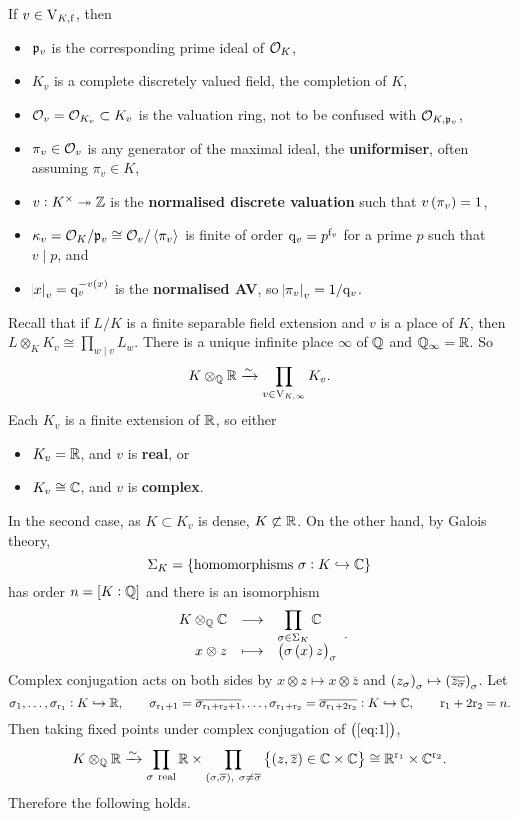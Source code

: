 \begin{notation*}
If $ v \in \mathrm{V}_{K, \mathrm{f}} $, then
\begin{itemize}
\item $ \mathfrak{p}_v $ is the corresponding prime ideal of $ \mathcal{O}_K $,
\item $ K_v $ is a complete discretely valued field, the completion of $ K $,
\item $ \mathcal{O}_v = \mathcal{O}_{K_v} \subset K_v $ is the valuation ring, not to be confused with $ \mathcal{O}_{K, \mathfrak{p}_v} $,
\item $ \pi_v \in \mathcal{O}_v $ is any generator of the maximal ideal, the \textbf{uniformiser}, often assuming $ \pi_v \in K $,
\item $ v : K^\times \twoheadrightarrow \mathbb{Z} $ is the \textbf{normalised discrete valuation} such that $ v\br{\pi_v} = 1 $,
\item $ \kappa_v = \mathcal{O}_K / \mathfrak{p}_v \cong \mathcal{O}_v / \left\langle \pi_v \right\rangle $ is finite of order $ \mathrm{q}_v = p^{\mathrm{f}_v} $ for a prime $ p $ such that $ v \mid p $, and
\item $ \abs{x}_v = \q_v^{-v\br{x}} $ is the \textbf{normalised AV}, so $ \abs{\pi_v}_v = 1 / \mathrm{q}_v $.
\end{itemize}
\end{notation*}

Recall that if $ L / K $ is a finite separable field extension and $ v $ is a place of $ K $, then $ L \otimes_K K_v \cong \prod_{w \mid v} L_w $. There is a unique infinite place $ \infty $ of $ \mathbb{Q} $ and $ \mathbb{Q}_\infty = \mathbb{R} $. So
$$ K \otimes_{\mathbb{Q}} \mathbb{R} \xrightarrow{\sim} \prod_{v \in \mathrm{V}_{K, \infty}} K_v. $$
Each $ K_v $ is a finite extension of $ \mathbb{R} $, so either
\begin{itemize}
\item $ K_v = \mathbb{R} $, and $ v $ is \textbf{real}, or
\item $ K_v \cong \mathbb{C} $, and $ v $ is \textbf{complex}.
\end{itemize}
In the second case, as $ K \subset K_v $ is dense, $ K \not\subset \mathbb{R} $. On the other hand, by Galois theory,
$$ \Sigma_K = \cbr{\text{homomorphisms} \ \sigma : K \hookrightarrow \CC} $$
has order $ n = \sbr{K : \QQ} $ and there is an isomorphism
\begin{equation}
\label{eq:1}
\function{K \otimes_\QQ \CC}{\prod_{\sigma \in \Sigma_K} \CC}{x \otimes z}{\br{\sigma\br{x}z}_\sigma}.
\end{equation}
Complex conjugation acts on both sides by $ x \otimes z \mapsto x \otimes \overline{z} $ and $ \br{z_\sigma}_\sigma \mapsto \br{\overline{z_{\overline{\sigma}}}}_\sigma $. Let
$$ \sigma_1, \dots, \sigma_{\mathrm{r}_1} : K \hookrightarrow \mathbb{R}, \qquad \sigma_{\mathrm{r}_1 + 1} = \overline{\sigma_{\mathrm{r}_1 + \mathrm{r}_2 + 1}}, \dots, \sigma_{\mathrm{r}_1 + \mathrm{r}_2} = \overline{\sigma_{\mathrm{r}_1 + 2\mathrm{r}_2}} : K \hookrightarrow \mathbb{C}, \qquad \mathrm{r}_1 + 2\mathrm{r}_2 = n. $$
Then taking fixed points under complex conjugation of $ \br{\ref{eq:1}} $,
$$ K \otimes_\QQ \RR \xrightarrow{\sim} \prod_{\sigma \ \text{real}} \RR \times \prod_{\br{\sigma, \overline{\sigma}}, \ \sigma \ne \overline{\sigma}} \cbr{\br{z, \overline{z}} \in \CC \times \CC} \cong \RR^{\r_1} \times \CC^{\r_2}. $$
Therefore the following holds.

